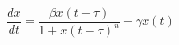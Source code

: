 
\begin{equation} \label{eq:MackeyGlass}
    \frac{dx}{dt} = \frac{\beta x(t-\tau)}{1 + x(t-\tau)^n} - \gamma x(t)
\end{equation}


